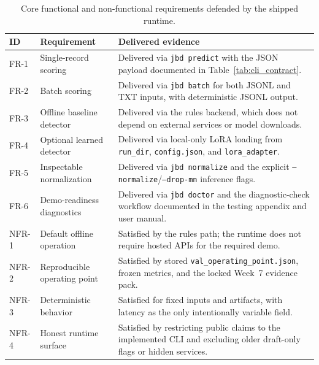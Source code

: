 ﻿\begin{table}[t]
\centering
\caption{Core functional and non-functional requirements defended by the shipped runtime.}
\label{tab:runtime_requirements}
\scriptsize
\begin{tabularx}{\textwidth}{p{}p{}X}
\toprule
ID & Requirement & Delivered evidence \\
\midrule
FR-1 & Single-record scoring & Delivered via \texttt{jbd predict} with the JSON payload documented in Table~\ref{tab:cli_contract}. \\
FR-2 & Batch scoring & Delivered via \texttt{jbd batch} for both JSONL and TXT inputs, with deterministic JSONL output. \\
FR-3 & Offline baseline detector & Delivered via the rules backend, which does not depend on external services or model downloads. \\
FR-4 & Optional learned detector & Delivered via local-only LoRA loading from \texttt{run\_dir}, \texttt{config.json}, and \texttt{lora\_adapter}. \\
FR-5 & Inspectable normalization & Delivered via \texttt{jbd normalize} and the explicit \texttt{--normalize}/\texttt{--drop-mn} inference flags. \\
FR-6 & Demo-readiness diagnostics & Delivered via \texttt{jbd doctor} and the diagnostic-check workflow documented in the testing appendix and user manual. \\
NFR-1 & Default offline operation & Satisfied by the rules path; the runtime does not require hosted APIs for the required demo. \\
NFR-2 & Reproducible operating point & Satisfied by stored \texttt{val\_operating\_point.json}, frozen metrics, and the locked Week~7 evidence pack. \\
NFR-3 & Deterministic behavior & Satisfied for fixed inputs and artifacts, with latency as the only intentionally variable field. \\
NFR-4 & Honest runtime surface & Satisfied by restricting public claims to the implemented CLI and excluding older draft-only flags or hidden services. \\
\bottomrule
\end{tabularx}
\normalsize
\end{table}
